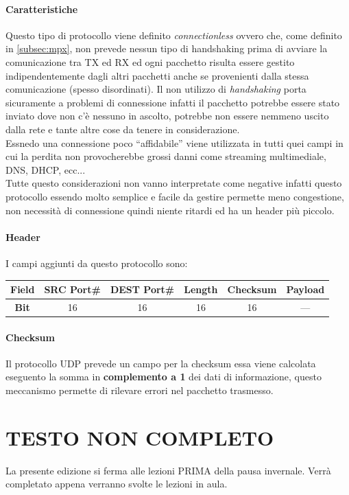 \documentclass[12pt]{article}
\begin{document}
\paragraph{Caratteristiche} Questo tipo di protocollo viene definito \textit{connectionless} ovvero che, come definito in \ref{subsec:mpx}, non prevede nessun tipo di handshaking prima di avviare la comunicazione tra TX ed RX ed ogni pacchetto risulta essere gestito indipendentemente dagli altri pacchetti anche se provenienti dalla stessa comunicazione (spesso disordinati). Il non utilizzo di \textit{handshaking} porta sicuramente a problemi di connessione infatti il pacchetto potrebbe essere stato inviato dove non c'è nessuno in ascolto, potrebbe non essere nemmeno uscito dalla rete e tante altre cose da tenere in considerazione.\\
Essnedo una connessione poco ``affidabile'' viene utilizzata in tutti quei campi in cui la perdita non provocherebbe grossi danni come streaming multimediale, DNS, DHCP, ecc...\\
Tutte questo considerazioni non vanno interpretate come negative infatti questo protocollo essendo molto semplice e facile da gestire permette meno congestione, non necessità di connessione quindi niente ritardi ed ha un header più piccolo.

\paragraph{Header} I campi aggiunti da questo protocollo sono:
\begin{center}
\begin{tabular}{ |c||c|c|c|c|c| }
 \hline
 \textbf{Field} & SRC Port\# & DEST Port\# & Length & Checksum & Payload \\
 \hline
 \hline
 \textbf{Bit} & 16 & 16 & 16 & 16 & --- \\
 \hline
\end{tabular}
\end{center}

\paragraph{Checksum} Il protocollo UDP prevede un campo per la checksum essa viene calcolata eseguento la somma in \textbf{complemento a 1} dei dati di informazione, questo meccanismo permette di rilevare errori nel pacchetto trasmesso.

\section{TESTO NON COMPLETO} %
La presente edizione si ferma alle lezioni PRIMA della pausa invernale. Verrà completato appena verranno svolte le lezioni in aula.
\end{document}
